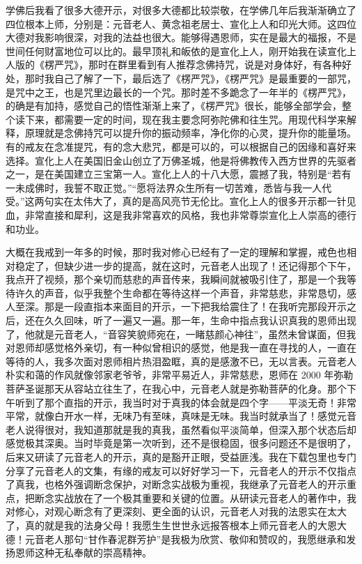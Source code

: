 学佛后我看了很多大德开示，对很多大德都比较崇敬，在学佛几年后我渐渐确立了四位根本上师，分别是：元音老人、黄念祖老居士、宣化上人和印光大师。这四位大德对我影响很深，对我的法益也很大。能够得遇恩师，实在是最大的福报，不是世间任何财富地位可以比的。最早顶礼和皈依的是宣化上人，刚开始我在读宣化上人版的《楞严咒》，那时在群里看到有人推荐念佛持咒，说是对身体好，有各种好处，那时我自己了解了一下，最后选了《楞严咒》，《楞严咒》是最重要的一部咒，是咒中之王，也是咒里边最长的一个咒。那时差不多跪念了一年半的《楞严咒》，的确是有加持，感觉自己的悟性渐渐上来了，《楞严咒》很长，能够全部学会，整个读下来，都需要一定的时间，现在我主要念阿弥陀佛和往生咒。用现代科学来解释，原理就是念佛持咒可以提升你的振动频率，净化你的心灵，提升你的能量场。有的戒友在念准提咒，有的念大悲咒，都是可以的，可以根据自己的因缘和喜好来选择。宣化上人在美国旧金山创立了万佛圣城，他是将佛教传入西方世界的先驱者之一，是在美国建立三宝第一人。宣化上人的十八大愿，震撼了我，特别是“若有一未成佛时，我誓不取正觉。”“愿将法界众生所有一切苦难，悉皆与我一人代受。”这两句实在太伟大了，真的是高风亮节无伦比。宣化上人的很多开示都一针见血，非常直接和犀利，这是我非常喜欢的风格，我也非常尊崇宣化上人崇高的德行和功业。

大概在我戒到一年多的时候，那时我对修心已经有了一定的理解和掌握，戒色也相对稳定了，但缺少进一步的提高，就在这时，元音老人出现了！还记得那个下午，我点开了视频，那个亲切而慈悲的声音传来，我瞬间就被吸引住了，那是一个我等待许久的声音，似乎我整个生命都在等待这样一个声音，非常慈悲，非常恳切，感人至深。那是一段直指本来面目的开示，一下把我给震住了！在我听完那段开示之后，还在久久回味，听了一遍又一遍。那一年，生命中指点我认识真我的恩师出现了，他就是元音老人，“音容笑貌师宛在，一睹慈颜心神往”，虽然未曾谋面，但我对恩师却感觉格外亲切，有一种似曾相识的感觉，他是我一直在寻找的人，一直在等待的人，我多次面对恩师相片热泪盈眶，真的是感激不已，无以言表。元音老人朴实和蔼的作风就像邻家老爷爷，非常平易近人，非常慈悲，恩师在 2000 年弥勒菩萨圣诞那天从容站立往生了，在我心中，元音老人就是弥勒菩萨的化身。那个下午听到了那个直指的开示，我当时对于真我的体会就是四个字——平淡无奇！非常平常，就像白开水一样，无味乃有至味，真味是无味。我当时就承当了！感觉元音老人说得很对，我知道那就是我的真我，虽然看似平淡简单，但深入那个状态后却感觉极其深奥。当时毕竟是第一次听到，还不是很稳固，很多问题还不是很明了，后来又研读了元音老人的开示，真的是豁开正眼，受益匪浅。我在下载包里也专门分享了元音老人的文集，有缘的戒友可以好好学习一下，元音老人的开示不仅指点了真我，也格外强调断念保护，对断念实战极为重视，我继承了元音老人的开示重点，把断念实战放在了一个极其重要和关键的位置。从研读元音老人的著作中，我对修心，对观心断念有了更深刻、更全面的认识，元音老人对我的法恩实在太大了，真的就是我的法身父母！我愿生生世世永远报答根本上师元音老人的大恩大德！元音老人那句“甘作春泥群芳护”是我极为欣赏、敬仰和赞叹的，我愿继承和发扬恩师这种无私奉献的崇高精神。

